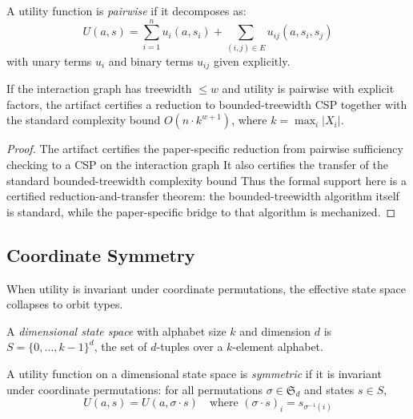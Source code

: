\begin{definition}\label{def:pairwise}
A utility function is \emph{pairwise} if it decomposes as:
\[
U(a, s) = \sum_{i=1}^n u_i(a, s_i) + \sum_{(i,j) \in E} u_{ij}(a, s_i, s_j)
\]
with unary terms $u_i$ and binary terms $u_{ij}$ given explicitly.
\end{definition}

\begin{theorem}\label{thm:treewidth}
If the interaction graph has treewidth $\leq w$ and utility is pairwise with explicit factors, the artifact certifies a reduction to bounded-treewidth CSP together with the standard complexity bound $O(n \cdot k^{w+1})$, where $k = \max_i |X_i|$.
\end{theorem}


\begin{proof}
The artifact certifies the paper-specific reduction from pairwise sufficiency checking to a CSP on the interaction graph  It also certifies the transfer of the standard bounded-treewidth complexity bound  Thus the formal support here is a certified reduction-and-transfer theorem: the bounded-treewidth algorithm itself is standard, while the paper-specific bridge to that algorithm is mechanized.
\end{proof}

\subsection{Coordinate Symmetry}\label{sec:tract-symmetry}

When utility is invariant under coordinate permutations, the effective state space collapses to orbit types.

\begin{definition}\label{def:dimensional}
A \emph{dimensional state space} with alphabet size $k$ and dimension $d$ is $S = \{0, \ldots, k-1\}^d$, the set of $d$-tuples over a $k$-element alphabet.
\end{definition}

\begin{definition}\label{def:symmetric}
A utility function on a dimensional state space is \emph{symmetric} if it is invariant under coordinate permutations: for all permutations $\sigma \in \mathfrak{S}_d$ and states $s \in S$,
\[
U(a, s) = U(a, \sigma \cdot s) \quad \text{where } (\sigma \cdot s)_i = s_{\sigma^{-1}(i)}
\]
\end{definition}

